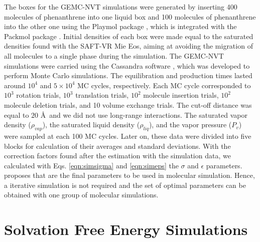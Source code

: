 The boxes for the GEMC-NVT simulations were generated by  inserting 400 molecules of phenanthrene into one liquid box and 100 molecules of phenanthrene into the other one using the Playmol package \cite{playmol}, which is integrated with the Packmol package \cite{packmol}. Initial densities of each box were made equal to the saturated densities found with the SAFT-VR Mie Eos, aiming at avoiding the migration of all molecules to a single phase during the simulation. The GEMC-NVT simulations were carried using the Cassandra software \cite{doi:10.1063/1.3644939},  which was developed to perform Monte Carlo simulations. The equilibration and production times lasted around  $10^{4}$ and $5 \times 10^{4}$ MC cycles, respectively. Each MC cycle corresponded to $10^3$ rotation trials, $10^3$ translation trials, $10^2$ molecule insertion trials, $10^2$ molecule deletion trials, and 10 volume exchange trials. The cut-off distance was equal to $20$ \AA  $\,$ and we did not use long-range interactions. The saturated vapor density ($\rho_{vap}$), the saturated liquid density ($\rho_{liq}$), and the vapor pressure ($P_{v}$) were sampled at each 100 MC cycles. Later on, these data were divided into five blocks for calculation of their averages and standard deviations. With the correction factors found after the estimation with the simulation data, we calculated with Eqs. \eqref{eqn:simsigma} and \eqref{eqn:simeps} the $\sigma$ and $\epsilon$ parameters.  proposes that are the final parameters to be used in molecular simulation. Hence, a iterative simulation is not required and the set of optimal parameters can be obtained with one group of molecular simulations. 

\section{Solvation Free Energy Simulations}\label{solvme}

